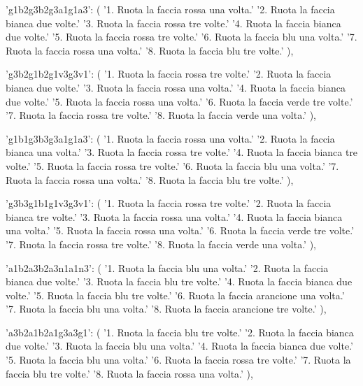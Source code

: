{{        'g1b2g3b2g3a1g1a3': (
            '1. Ruota la faccia rossa una volta.\n'
            '2. Ruota la faccia bianca due volte.\n'
            '3. Ruota la faccia rossa tre volte.\n'
            '4. Ruota la faccia bianca due volte.\n'
            '5. Ruota la faccia rossa tre volte.\n'
            '6. Ruota la faccia blu una volta.\n'
            '7. Ruota la faccia rossa una volta.\n'
            '8. Ruota la faccia blu tre volte.'
        ),

        'g3b2g1b2g1v3g3v1': (
            '1. Ruota la faccia rossa tre volte.\n'
            '2. Ruota la faccia bianca due volte.\n'
            '3. Ruota la faccia rossa una volta.\n'
            '4. Ruota la faccia bianca due volte.\n'
            '5. Ruota la faccia rossa una volta.\n'
            '6. Ruota la faccia verde tre volte.\n'
            '7. Ruota la faccia rossa tre volte.\n'
            '8. Ruota la faccia verde una volta.'
        ),

        'g1b1g3b3g3a1g1a3': (
            '1. Ruota la faccia rossa una volta.\n'
            '2. Ruota la faccia bianca una volta.\n'
            '3. Ruota la faccia rossa tre volte.\n'
            '4. Ruota la faccia bianca tre volte.\n'
            '5. Ruota la faccia rossa tre volte.\n'
            '6. Ruota la faccia blu una volta.\n'
            '7. Ruota la faccia rossa una volta.\n'
            '8. Ruota la faccia blu tre volte.'
        ),

        'g3b3g1b1g1v3g3v1': (
            '1. Ruota la faccia rossa tre volte.\n'
            '2. Ruota la faccia bianca tre volte.\n'
            '3. Ruota la faccia rossa una volta.\n'
            '4. Ruota la faccia bianca una volta.\n'
            '5. Ruota la faccia rossa una volta.\n'
            '6. Ruota la faccia verde tre volte.\n'
            '7. Ruota la faccia rossa tre volte.\n'
            '8. Ruota la faccia verde una volta.'
        ),

        'a1b2a3b2a3n1a1n3': (
            '1. Ruota la faccia blu una volta.\n'
            '2. Ruota la faccia bianca due volte.\n'
            '3. Ruota la faccia blu tre volte.\n'
            '4. Ruota la faccia bianca due volte.\n'
            '5. Ruota la faccia blu tre volte.\n'
            '6. Ruota la faccia arancione una volta.\n'
            '7. Ruota la faccia blu una volta.\n'
            '8. Ruota la faccia arancione tre volte.'
        ),

        'a3b2a1b2a1g3a3g1': (
            '1. Ruota la faccia blu tre volte.\n'
            '2. Ruota la faccia bianca due volte.\n'
            '3. Ruota la faccia blu una volta.\n'
            '4. Ruota la faccia bianca due volte.\n'
            '5. Ruota la faccia blu una volta.\n'
            '6. Ruota la faccia rossa tre volte.\n'
            '7. Ruota la faccia blu tre volte.\n'
            '8. Ruota la faccia rossa una volta.'
        ),

}}
